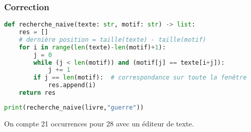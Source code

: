 \documentclass[svgnames,11pt]{beamer}
\begin{document}
\begin{frame}[fragile]
    \frametitle{Correction}

    \begin{center}
    \begin{lstlisting}[language=Python , basicstyle=\small, xleftmargin=1em, xrightmargin=1em]
def recherche_naive(texte: str, motif: str) -> list:
    res = []
    # dernière position = taille(texte) - taille(motif)
    for i in range(len(texte)-len(motif)+1):
        j = 0
        while (j < len(motif)) and (motif[j] == texte[i+j]):
            j += 1     
        if j == len(motif):  # correspondance sur toute la fenêtre
            res.append(i)
    return res
\end{lstlisting}
    \end{center}

    \begin{center}
    \begin{lstlisting}[language=Python , basicstyle=\small, xleftmargin=2em, xrightmargin=2em]
print(recherche_naive(livre,"guerre"))
\end{lstlisting}
    \end{center}
On compte 21 occurrences pour 28 avec un éditeur de texte.
\end{frame}
\end{document}
